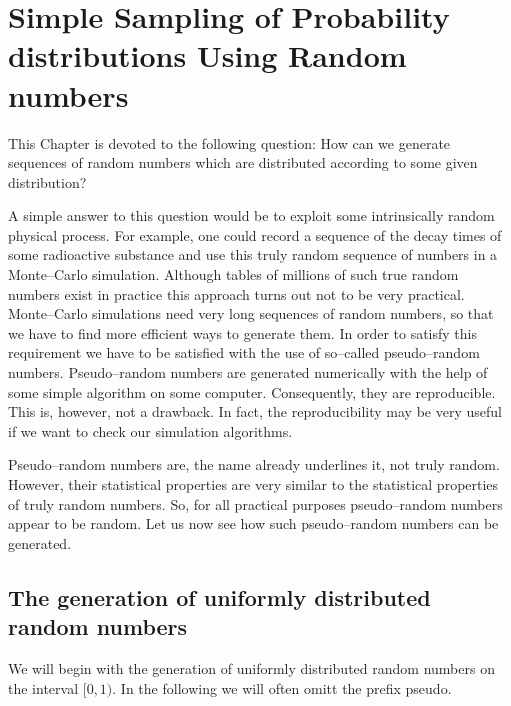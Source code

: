 \chapter{Simple Sampling of Probability distributions Using Random numbers}
This Chapter is devoted to the following question: How can we 
generate sequences of random numbers which are distributed 
according to some given distribution?

A simple answer to this question would be to exploit some 
intrinsically random physical process. For example, one could 
record a sequence of the decay times of some radioactive substance 
and use this truly random sequence of numbers in a Monte--Carlo
simulation. Although tables of millions of such true random 
numbers exist in practice this approach turns out not to be very
practical. Monte--Carlo simulations need very long sequences of 
random numbers, so that we have to find more efficient ways to 
generate them. In order to satisfy this requirement we have to 
be satisfied with the use of so--called pseudo--random numbers.
Pseudo--random numbers are generated numerically with the help of 
some simple algorithm on some computer. Consequently, they are
reproducible. This is, however, not a drawback. In fact, the 
reproducibility may be very useful if we want to check our 
simulation algorithms. 

Pseudo--random numbers are, the name already underlines it, not 
truly random. However, their statistical properties are very 
similar to the statistical properties of truly random numbers. So, 
for all practical purposes pseudo--random numbers appear to be 
random. Let us now see how such pseudo--random numbers can be 
generated.

\section{The generation of uniformly distributed random numbers}
We will begin with the generation of uniformly distributed random 
numbers on the interval $[0,1)$. In the following we will often 
omitt the prefix pseudo. 

